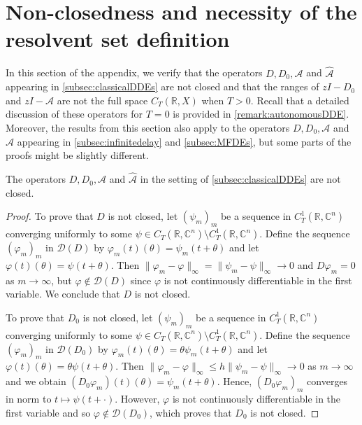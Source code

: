 \documentclass[english]{myarticle}
\begin{document}
\begin{sloppypar}
\section{Non-closedness and necessity of the resolvent set definition} \label{sec:nonclosed}
In this section of the appendix, we verify that the operators $D, D_0, \mathcal{A}$ and $\hat{\mathcal{A}}$ appearing in \cref{subsec:classicalDDEs} are not closed and that the ranges of $zI-D_0$ and $zI-\mathcal{A}$ are not the full space $C_T(\mathbb{R},X)$ when $T > 0$. Recall that a detailed discussion of these operators for $T = 0$ is provided in \cref{remark:autonomousDDE}. Moreover, the results from this section also apply to the operators $D, D_0, \mathcal{A}$ and $\hat{\mathcal{A}}$ appearing in \cref{subsec:infinitedelay} and \cref{subsec:MFDEs}, but some parts of the proofs might be slightly different.

\begin{proposition} \label{prop:DAnotclosed}
The operators $D, D_0, \mathcal{A}$ and $\hat{\mathcal{A}}$ in the setting of \cref{subsec:classicalDDEs} are not closed.
\end{proposition}
\begin{proof}
To prove that $D$ is not closed, let $(\psi_m)_m$ be a sequence in $C_T^1(\mathbb{R},\mathbb{C}^n)$ converging uniformly to some $\psi \in C_T(\mathbb{R},\mathbb{C}^n) \setminus C_T^1(\mathbb{R},\mathbb{C}^n)$. Define the sequence $(\varphi_m)_m$ in $\mathcal{D}(D)$ by $\varphi_m(t)(\theta) = \psi_m(t+\theta)$ and let $\varphi(t)(\theta) = \psi(t+\theta)$. Then $\| \varphi_m - \varphi \|_\infty = \| \psi_m - \psi \|_{\infty} \to 0$ and $D\varphi_m = 0$ as $m \to \infty$, but $\varphi \notin \mathcal{D}(D)$ since $\varphi$ is not continuously differentiable in the first variable. We conclude that $D$ is not closed. 

To prove that $D_0$ is not closed, let $(\psi_m)_m$ be a sequence in $C_T^1(\mathbb{R},\mathbb{C}^n)$ converging uniformly to some $\psi \in C_T(\mathbb{R},\mathbb{C}^n) \setminus C_T^1(\mathbb{R},\mathbb{C}^n)$. Define the sequence $(\varphi_m)_m$ in $\mathcal{D}(D_0)$ by $\varphi_m(t)(\theta) = \theta \psi_m(t+\theta)$ and let $\varphi(t)(\theta) = \theta \psi(t+\theta)$. Then $\| \varphi_m - \varphi \|_\infty \leq h \| \psi_m - \psi \|_{\infty} \to 0$ as $m \to \infty$ and we obtain $(D_0\varphi_m)(t)(\theta) = \psi_m(t+\theta)$. Hence, $(D_0\varphi_m)_m$ converges in norm to $t \mapsto \psi(t+\cdot)$. However, $\varphi$ is not continuously differentiable in the first variable and so $\varphi \notin \mathcal{D}(D_0)$, which proves that $D_0$ is not closed.


\end{proof}
\end{sloppypar}
\end{document}

